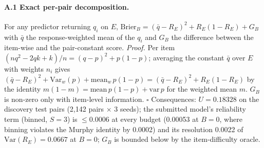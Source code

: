 \documentclass{article}
\begin{document}
\paragraph{A.1 Exact per-pair decomposition.} For any predictor returning $q_i$ on $E$, $\mathrm{Brier}_B = (\bar q -
R_E)^2 + R_E(1-R_E) + G_B$ with $\bar q$ the response-weighted mean of the $q_i$ and $G_B$ the difference between the
item-wise and the pair-constant score. \emph{Proof.} Per item $(nq^2 - 2qk + k)/n = (q-p)^2 + p(1-p)$; averaging the
constant $\bar q$ over $E$ with weights $n_i$ gives $(\bar q - R_E)^2 + \mathrm{Var}_w(p) + \mathrm{mean}_w\,p(1-p) =
(\bar q - R_E)^2 + R_E(1-R_E)$ by the identity $m(1-m) = \mathrm{mean}\,p(1-p) + \mathrm{var}\,p$ for the weighted mean
$m$. $G_B$ is non-zero only with item-level information. $\square$ Consequences: $U = 0.18328$ on the discovery test pairs
(2,142 pairs $\times$ 3 seeds); the submitted model's reliability term (binned, $S = 3$) is $\le 0.0006$ at every budget
(0.00053 at $B = 0$, where binning violates the Murphy identity by 0.0002) and its resolution 0.0022 of
$\mathrm{Var}(R_E) = 0.0667$ at $B = 0$; $G_B$ is bounded below by the item-difficulty oracle.
\end{document}
